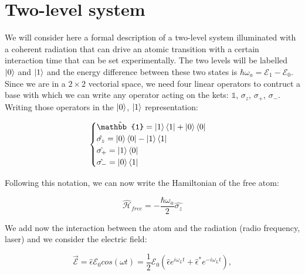 \section{Two-level system}

We will consider here a formal description of a two-level system illuminated with a coherent radiation that can drive an atomic transition with a certain interaction time that can be set experimentally.
The two levels will be labelled $\ket{0}$ and $\ket{1}$ and the energy difference between these two states is $\hbar \omega _{a} = \mathcal{E}_{1} - \mathcal{E}_{0}$. Since we are in a $2 \times 2$ vectorial space, we need four linear operators to contruct a base with which we can write any operator acting 
on the kets: {$\mathbb{1}$, $\sigma_{z}$, $\sigma_{+}$, $\sigma_{-}$}. Writing those operators in the $\ket{0}$, $\ket{1}$ representation:

\begin{equation}
\begin{cases}
    \hat{\mathbb{1}} =  \ket{1}\bra{1} + \ket{0}\bra{0}\\
    \hat{\sigma_{z}} = \ket{0}\bra{0} - \ket{1}\bra{1} \\
    \hat{\sigma_{+}} = \ket{1}\bra{0} \\
    \hat{\sigma_{-}} = \ket{0}\bra{1}
\end{cases}
\end{equation}

Following this notation, we can now write the Hamiltonian of the free atom:

\begin{equation}
    \hat{\mathcal{H}} _{free} = - \frac {\hbar \omega_{a}}{2} \hat{\sigma_{z}}
\end{equation}

We add now the interaction between the atom and the radiation (radio frequency, laser) and we consider the electric field:

\begin{equation}
    \vec {\mathcal{E}} = \hat{\epsilon} \mathcal{E}_{0} cos (\omega t) = \frac{1}{2} \mathcal{E}_{0} ( \hat{\epsilon}e^{i \omega_{L} t} + \hat{\epsilon}^{*}e^{ - i \omega_{L} t}),
\end{equation}

